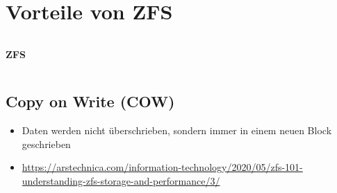     \section{Vorteile von ZFS}\label{sec:vorteile-von-zfs}
    \begin{frame}
        \begin{columns}
            \begin{column}{.5\textwidth}
                \centering
                \Large
                \textcolor{TUDa-1b}{\textbf{ZFS}}
            \end{column}
            \begin{column}{.5\textwidth}
            \end{column}
        \end{columns}
    \end{frame}

    \subsection{Copy on Write (COW)}\label{subsec:copy-on-write}
    \begin{frame}
        \slidehead
        \begin{itemize}[<+->]
            \item Daten werden nicht überschrieben, sondern immer in einem neuen Block geschrieben
            \item \url{https://arstechnica.com/information-technology/2020/05/zfs-101-understanding-zfs-storage-and-performance/3/}
        \end{itemize}
    \end{frame}

